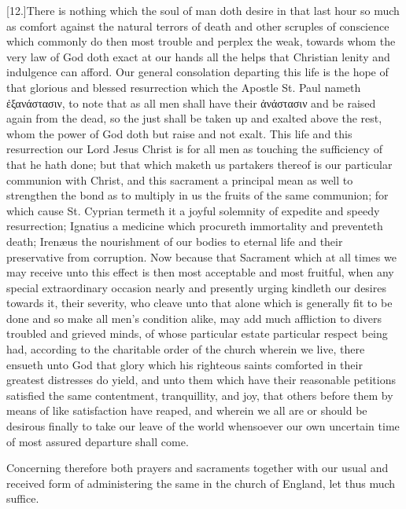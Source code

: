 [12.]There is nothing which the soul of man doth desire in that last hour so much as comfort against the natural terrors of death and other scruples of conscience which commonly do then most trouble and perplex the weak, towards whom the very law of God doth exact at our hands all the helps that Christian lenity and indulgence can afford. Our general consolation departing this life is the hope of that glorious and blessed resurrection which the Apostle St. Paul nameth ἐξανάστασιν, to note that as all men shall  have their ἀνάστασιν and be raised again from the dead, so the just shall be taken up and exalted above the rest, whom the power of God doth but raise and not exalt. This life and this resurrection our Lord Jesus Christ is for all men as touching the sufficiency of that he hath done; but that which maketh us partakers thereof is our particular communion with Christ, and this sacrament a principal mean as well to strengthen the bond as to multiply in us the fruits of the same communion; for which cause St. Cyprian termeth it a joyful solemnity of expedite and speedy resurrection; Ignatius a medicine which procureth immortality and preventeth death; Irenæus the nourishment of our bodies to eternal life and their preservative from corruption. Now because that Sacrament which at all times we may receive unto this effect is then most acceptable and most fruitful, when any special extraordinary occasion nearly and presently urging kindleth our desires towards it, their severity, who cleave unto that alone which is generally fit to be done and so make all men’s condition alike, may add much affliction to divers troubled and grieved minds, of whose particular estate particular respect being had, according to the charitable order of the church wherein we live, there ensueth unto God that glory which his righteous saints comforted in their greatest distresses do yield, and unto them which have their reasonable petitions satisfied the same contentment, tranquillity, and joy, that others before them by means of like satisfaction have reaped, and wherein we all are or should be desirous finally to take our leave of the world whensoever our own uncertain time of most assured departure shall come.

Concerning therefore both prayers and sacraments together with our usual and received form of administering the same in the church of England, let thus much suffice.




